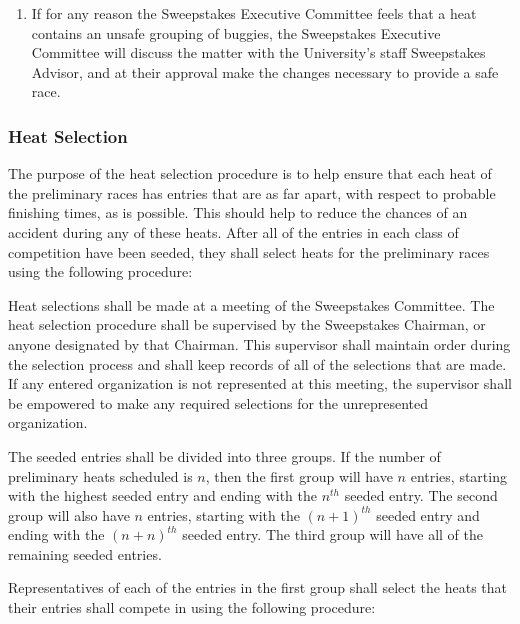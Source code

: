 \begin{enumerate}
		\item If for any reason the Sweepstakes Executive Committee feels that
		a heat contains an unsafe grouping of buggies, the Sweepstakes Executive
		Committee will discuss the matter with the University's staff Sweepstakes
		Advisor, and at their approval make the changes necessary to provide a safe
		race.

	\end{enumerate}

\subsubsection{Heat Selection}
	
	The purpose of the heat selection procedure is to help ensure that each heat of
	the preliminary races has entries that are as far apart, with respect to
	probable finishing times, as is possible. This should help to reduce the
	chances of an accident during any of these heats. After all of the entries in
	each class of competition have been seeded, they shall select heats for the
	preliminary races using the following procedure:

	Heat selections shall be made at a meeting of the Sweepstakes Committee. The
	heat selection procedure shall be supervised by the Sweepstakes Chairman, or
	anyone designated by that Chairman. This supervisor shall maintain order during
	the selection process and shall keep records of all of the selections that are
	made. If any entered organization is not represented at this meeting, the
	supervisor shall be empowered to make any required selections for the
	unrepresented organization.

	The seeded entries shall be divided into three groups. If the number of
	preliminary heats scheduled is $n$, then the first group will have $n$ entries,
	starting with the highest seeded entry and ending with the $n^{th}$ seeded
	entry. The second group will also have $n$ entries, starting with the
	$(n+1)^{th}$ seeded entry and ending with the $(n+n)^{th}$ seeded entry. The
	third group will have all of the remaining seeded entries.

	Representatives of each of the entries in the first group shall select the
	heats that their entries shall compete in using the following procedure:

